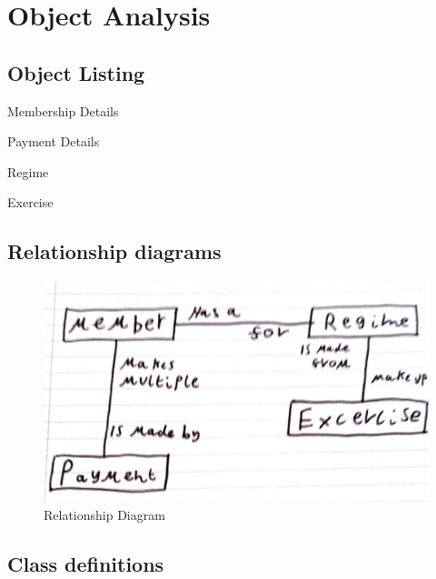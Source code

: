 \section{Object Analysis}

\subsection{Object Listing}

Membership Details

Payment Details

Regime

Exercise

\subsection{Relationship diagrams}

\begin{figure}[H]
    \includegraphics[width=\textwidth]{RelationshipDiagram.jpg}
    \caption{Relationship Diagram} \label{fig: Relationship Diagram}
\end{figure}

\subsection{Class definitions}


